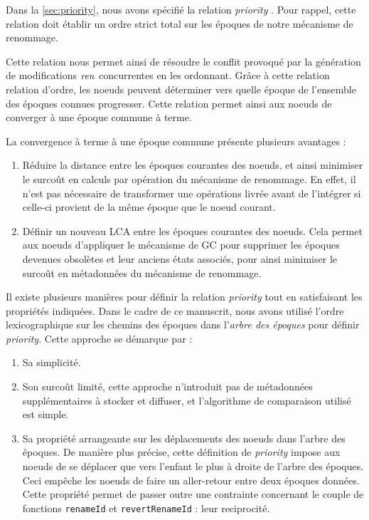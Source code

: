 \label{sec:alternative-priority}

Dans la \autoref{sec:priority}, nous avons spécifié la relation \emph{priority} .
Pour rappel, cette relation doit établir un ordre strict total sur les époques de notre mécanisme de renommage.

Cette relation nous permet ainsi de résoudre le conflit provoqué par la génération de modifications $\mathit{ren}$ concurrentes en les ordonnant.
Grâce à cette relation relation d'ordre, les noeuds peuvent déterminer vers quelle époque de l'ensemble des époques connues progresser.
Cette relation permet ainsi aux noeuds de converger à une époque commune à terme.

La convergence à terme à une époque commune présente plusieurs avantages :
\begin{enumerate}
    \item Réduire la distance entre les époques courantes des noeuds, et ainsi minimiser le surcoût en calculs par opération du mécanisme de renommage.
        En effet, il n'est pas nécessaire de transformer une opérations livrée avant de l'intégrer si celle-ci provient de la même époque que le noeud courant.
    \item Définir un nouveau \ac{LCA} entre les époques courantes des noeuds.
        Cela permet aux noeuds d'appliquer le mécanisme de \ac{GC} pour supprimer les époques devenues obsolètes et leur anciens états associés, pour ainsi minimiser le surcoût en métadonnées du mécanisme de renommage.
\end{enumerate}

Il existe plusieurs manières pour définir la relation \emph{priority} tout en satisfaisant les propriétés indiquées.
Dans le cadre de ce manuscrit, nous avons utilisé l'ordre lexicographique sur les chemins des époques dans l'\emph{arbre des époques} pour définir \emph{priority}.
Cette approche se démarque par :
\begin{enumerate}
    \item Sa simplicité.
    \item Son surcoût limité, \ie cette approche n'introduit pas de métadonnées supplémentaires à stocker et diffuser, et l'algorithme de comparaison utilisé est simple.
    \item Sa propriété arrangeante sur les déplacements des noeuds dans l'arbre des époques.
        De manière plus précise, cette définition de \emph{priority} impose aux noeuds de se déplacer que vers l'enfant le plus à droite de l'arbre des époques.
        Ceci empêche les noeuds de faire un aller-retour entre deux époques données.
        Cette propriété permet de passer outre une contrainte concernant le couple de fonctions \texttt{renameId} et \texttt{revertRenameId} : leur reciprocité.
\end{enumerate}

